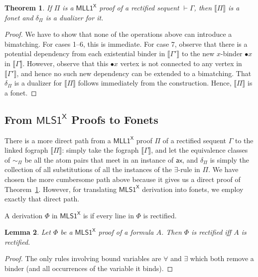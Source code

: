 \documentclass[conference,twosided,10pt]{IEEEtran}
\newtheorem{thm}{Theorem}%
\newtheorem{lemma}[thm]{Lemma}
\theoremstyle{definition}
\newcommand{\Deri}{\Phi}
\newcommand*{\FOMLL}{\mathsf{MLL1^X}}
\newcommand*{\FOMLS}{\mathsf{MLS1^X}}
\newcommand{\ax}{\mathsf{ax}}
\newcommand{\sqn}[1]{\vdash#1}
\newcommand{\single}[1]{\bullet#1}
\newcommand{\fographof}[1]{\llbracket#1\rrbracket}
\newcommand{\graphof}[1]{\llbracket#1\rrbracket}
\newcommand{\dsubstof}[1]{\delta_{#1}}
\newcommand{\linkingof}[1]{\sim_{#1}}
\begin{document}
\begin{thm}
  \label{thm:MLL1->fonet}
  If $\Pi$ is a $\FOMLL$ proof of a rectified sequent $\sqn\Gamma$,
  then $\fographof\Pi$ is a fonet and $\dsubstof\Pi$ is a dualizer for it.
\end{thm}

\begin{proof}
  We have to show that none of the operations above can introduce a
  bimatching. For cases 1--6, this is immediate. For case 7, observe
  that there is a potential dependency from each existential binder in
  $\graphof{\Gamma'}$ to the new $x$-binder $\single x$ in
  $\graphof{\Gamma}$. However, observe that this $\single x$ vertex is
  not connected to any vertex in $\graphof{\Gamma'}$, and hence no
  such new dependency can be extended to a bimatching. That
  $\dsubstof\Pi$ is a dualizer for $\fographof\Pi$ follows immediately
  from the construction. Hence,  $\fographof\Pi$ is a fonet.
\end{proof}

\subsection{From $\FOMLS$ Proofs to Fonets}

There is a more direct path from a $\FOMLL$ proof $\Pi$ of a rectified
sequent $\Gamma$ to the linked fograph $\fographof\Pi$: simply take
the fograph $\graphof\Gamma$, and let the equivalence classes of
$\linkingof\Pi$ be all the atom pairs that meet in an instance of
$\ax$, and $\dsubstof\Pi$ is simply the collection of all substitutions
of all the instances of the $\exists$-rule in $\Pi$.
%
We have chosen the more cumbersome path above because it gives us a
direct proof of Theorem~\ref{thm:MLL1->fonet}.
%
However, for translating $\FOMLS$ derivation into fonets, we employ
exactly that direct path.

A derivation $\Deri$ in $\FOMLS$ is  if every line in $\Deri$ is
rectified.

\begin{lemma}
  Let  $\Deri$ be a $\FOMLS$ proof of a formula $A$. Then $\Deri$ is rectified iff $A$ is rectified.
\end{lemma}

\begin{proof}
   The only rules involving bound
   variables are $\forall$ and $\exists$ which both remove a binder (and
   all occurrences of the variable it binds).
\end{proof}
\end{document}
